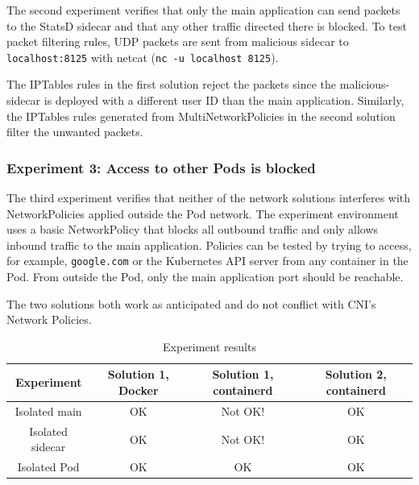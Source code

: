 \documentclass[english, 12pt, a4paper, sci, utf8, a-2b, online]{aaltothesis}
\begin{document}
The second experiment verifies that only the main application can send packets to the StatsD sidecar and that any other traffic directed there is blocked.
To test packet filtering rules, UDP packets are sent from malicious sidecar to \lstinline{localhost:8125} with netcat (\lstinline{nc -u localhost 8125}).

The IPTables rules in the first solution reject the packets since the malicious-sidecar is deployed with a different user ID than the main application.
Similarly, the IPTables rules generated from MultiNetworkPolicies in the second solution filter the unwanted packets.

\subsubsection{Experiment 3: Access to other Pods is blocked}

The third experiment verifies that neither of the network solutions interferes with NetworkPolicies applied outside the Pod network.
The experiment environment uses a basic NetworkPolicy that blocks all outbound traffic and only allows inbound traffic to the main application.
Policies can be tested by trying to access, for example, \lstinline{google.com} or the Kubernetes API server from any container in the Pod.
From outside the Pod, only the main application port should be reachable.

The two solutions both work as anticipated and do not conflict with CNI's Network Policies.

\begin{table}[H]
  \sffamily
  \centering
  \caption{Experiment results}
  \label{table:evaluation-results}

  \begin{minipage}{\textwidth}
  \renewcommand{\thempfootnote}{\arabic{mpfootnote}}
  \begin{tabularx}{\textwidth}{CCCC}
    \textbf{Experiment} & \textbf{Solution 1, Docker} & \textbf{Solution 1, containerd} & \textbf{Solution 2, containerd} \\ \hline
    Isolated main & OK & Not OK! & OK \\ \hline
    Isolated sidecar & OK & Not OK! & OK \\ \hline
    Isolated Pod & OK & OK & OK \\ \hline
  \end{tabularx}
  \end{minipage}
\end{table}
\end{document}
